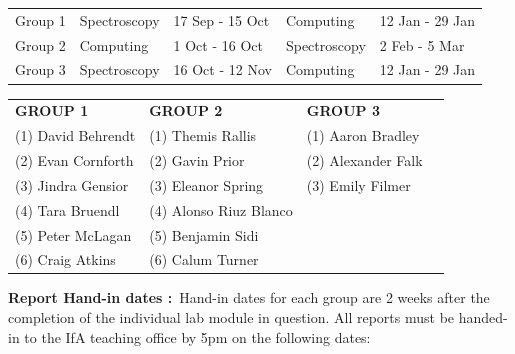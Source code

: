\documentclass[12pt]{article}
\begin{document}
\begin{minipage}{18.0cm}
\begin{center}
\begin{tabular}{lllll}
Group 1&  Spectroscopy &17 Sep - 15 Oct& Computing &12 Jan - 29 Jan\\
Group 2&  Computing &1 Oct - 16 Oct& Spectroscopy &\phantom{1}2 Feb - \phantom{1}5 Mar\\
Group 3&  Spectroscopy &16 Oct - 12 Nov& Computing & 12 Jan - 29 Jan\\
\end{tabular}
\end{center}

\begin{center}
\begin{tabular}{llll}

{\bf GROUP 1}   &   {\bf GROUP 2}      & {\bf GROUP 3}    \\  %
(1) David Behrendt   & (1) Themis Rallis    & (1) Aaron Bradley     \\ %
(2) Evan Cornforth   & (2) Gavin Prior        & (2)   Alexander Falk \\ %
(3) Jindra Gensior  & (3)  Eleanor Spring      & (3)   Emily Filmer \\%
(4) Tara Bruendl   & (4)  Alonso Riuz Blanco   &  \\ %
(5) Peter McLagan   & (5) Benjamin Sidi    &      \\ %
(6) Craig Atkins  & (6) Calum Turner   &      \\ %

\end{tabular}
\end{center}



{\bf Report Hand-in dates :}\  Hand-in dates for each group are 2 weeks after the completion of the individual lab module in question. All reports must be handed-in to the IfA teaching office by 5pm on the following dates:\\


\end{minipage}
\end{document}
